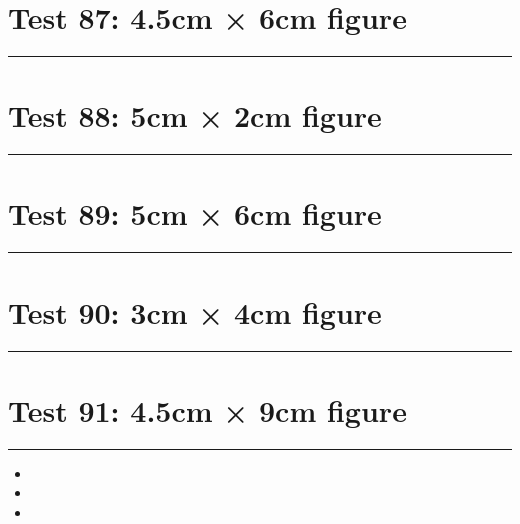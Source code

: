 \documentclass[a4paper,11pt]{article}
\begin{document}
\section*{Test 87: 4.5cm × 6cm figure}
\begin{swarmwrap}%
  \begin{minipage}[t]{4cm}
    \centering
    \rule{\linewidth}{6cm}
  \end{minipage}%
\end{swarmwrap}%
\swarmwrapnext
\lipsum[66]
\lipsum[67]
\lipsum[68]
\lipsum[69]
\lipsum[70]
\lipsum[71]
\section*{Test 88: 5cm × 2cm figure}
\begin{swarmwrap}%
  \begin{minipage}[t]{5cm}
    \centering
    \rule{\linewidth}{2cm}
  \end{minipage}%
\end{swarmwrap}%
\swarmwrapnext
\lipsum[110]
\lipsum[111]
\lipsum[112]
\section*{Test 89: 5cm × 6cm figure}
\begin{swarmwrap}%
  \begin{minipage}[t]{5cm}
    \centering
    \rule{\linewidth}{6cm}
  \end{minipage}%
\end{swarmwrap}%
\swarmwrapnext
\lipsum[2]
\lipsum[3]
\lipsum[4]
\section*{Test 90: 3cm × 4cm figure}
\begin{swarmwrap}%
  \begin{minipage}[t]{3cm}
    \centering
    \rule{\linewidth}{4cm}
  \end{minipage}%
\end{swarmwrap}%
\swarmwrapnext
\lipsum[43]
\lipsum[44]
\lipsum[45]
\lipsum[46]
\lipsum[47]
\section*{Test 91: 4.5cm × 9cm figure}
\begin{swarmwrap}%
  \begin{minipage}[t]{4cm}
    \centering
    \rule{\linewidth}{9cm}
  \end{minipage}%
\end{swarmwrap}
\begin{itemize}
  \item \swarmwrapnext\lipsum[144][1-4]
  \item \lipsum[146][1-3]
  \item \lipsum[147][1-3]
\end{itemize}
\end{document}
